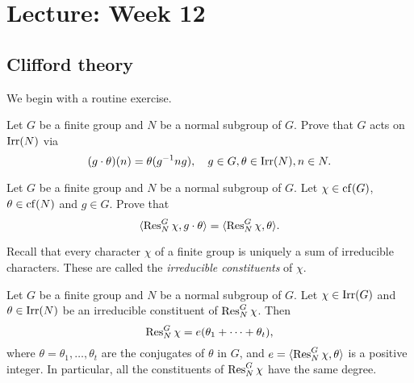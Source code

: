 \section{Lecture: Week 12}

\subsection{Clifford theory}

We begin with a routine exercise. 


\begin{exercise}
\label{xca:conjugate_chars1}
Let $G$ be a finite group and $N$ be a normal subgroup
of $G$. Prove that $G$ acts on $\operatorname{Irr}(N)$ via 
\[
(g\cdot\theta)(n)=\theta(g^{-1}ng),\quad 
g\in G,\theta\in\operatorname{Irr}(N),n\in N.
\]
\end{exercise}

\begin{exercise}
\label{xca:conjugate_chars2}
Let $G$ be a finite group and $N$ be a normal subgroup of $G$. 
Let $\chi\in\operatorname{cf}(G)$, $\theta\in\operatorname{cf}(N)$ and $g\in G$. Prove that
\[
\langle\operatorname{Res}_N^G\chi,g\cdot\theta\rangle=\langle\operatorname{Res}_N^G\chi,\theta\rangle.
\]
\end{exercise}

Recall that every character $\chi$ of a finite group is uniquely 
a sum of irreducible characters. These are called
the \emph{irreducible constituents} of $\chi$. 

\begin{theorem}[Clifford]
\label{thm:Clifford}
    Let $G$ be a finite group and $N$ be a normal
    subgroup of $G$. Let $\chi\in\operatorname{Irr}(G)$ and $\theta\in\operatorname{Irr}(N)$ be 
    an irreducible constituent of $\operatorname{Res}_N^G\chi$. 
    Then 
    \[
    \operatorname{Res}_N^G\chi = e(\theta_1+\cdots+\theta_t),
    \]
    where $\theta=\theta_1,\dots,\theta_t$ are the conjugates 
    of $\theta$ in $G$, 
    and $e=\langle\operatorname{Res}_N^G\chi,\theta\rangle$ is a positive integer. In particular, all the constituents of $\operatorname{Res}_N^G\chi$ have the same degree. 
\end{theorem}

